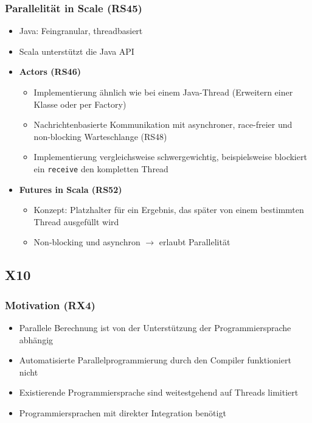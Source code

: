 \subsubsection{Parallelität in Scale (RS45)}
\begin{itemize}
	\item Java: Feingranular, threadbasiert
	\item Scala unterstützt die Java API
	\item \textbf{Actors (RS46)}
	\begin{itemize}
		\item Implementierung ähnlich wie bei einem Java-Thread (Erweitern einer Klasse oder per Factory)
		\item Nachrichtenbasierte Kommunikation mit asynchroner, race-freier und non-blocking Warteschlange (RS48)
		\item Implementierung vergleichsweise schwergewichtig, beispielsweise blockiert ein \texttt{receive} den kompletten Thread
	\end{itemize}
	\item \textbf{Futures in Scala (RS52)}
	\begin{itemize}
		\item Konzept: Platzhalter für ein Ergebnis, das später von einem bestimmten Thread ausgefüllt wird
		\item Non-blocking und asynchron \(\rightarrow\) erlaubt Parallelität
	\end{itemize}
\end{itemize}


\subsection{X10}

\subsubsection{Motivation (RX4)}
\begin{itemize}
	\item Parallele Berechnung ist von der Unterstützung der Programmiersprache abhängig
	\item Automatisierte Parallelprogrammierung durch den Compiler funktioniert nicht
	\item Existierende Programmiersprache sind weitestgehend auf Threads limitiert
	\item Programmiersprachen mit direkter Integration benötigt
\end{itemize}

